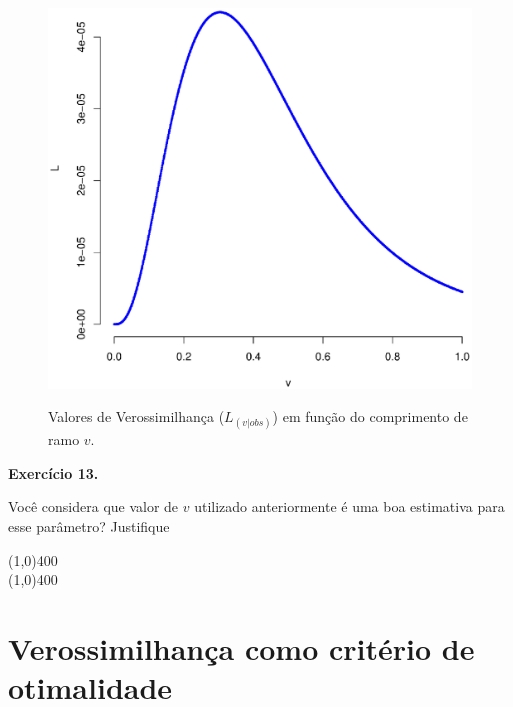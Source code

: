 \begin{refsection}
  \begin{figure}[h!]
       \centering
      {\includegraphics[scale=0.55]{figures/tut12/plot_3.eps}}
      {\caption{Valores de Verossimilhança ($L_{(v|obs)}$) em função do comprimento de ramo $v$.}\label{fig:plot3}}
  \end{figure}


\begin{blackBlock}{\textbf{Exercício 13.}}\label{tut12:ex:13.3}

Você considera que valor de $v$ utilizado anteriormente é uma boa estimativa para esse parâmetro? Justifique

\end{blackBlock}

\begin{center}
\line(1,0){400}\\
\line(1,0){400}\\
\end{center}


\section{Verossimilhança como critério de otimalidade} \label{tut12:first_sec}


\end{refsection}
